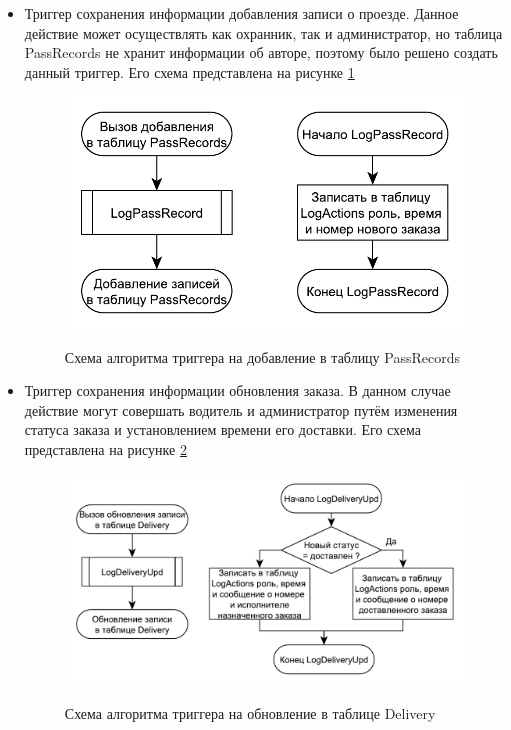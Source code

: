 \begin{itemize}
	\item Триггер сохранения информации добавления записи о проезде. Данное действие может осуществлять как охранник, так и администратор, но таблица PassRecords не хранит информации об авторе, поэтому было решено создать данный триггер. Его схема представлена на рисунке \ref{pass_trig}
	
	\begin{figure}[h!]
		\begin{center}
			{\includegraphics[scale=0.4, angle=0]{sql_schemes/pass_rec}}
			\caption{Схема алгоритма триггера на добавление в таблицу PassRecords}
			\label{pass_trig}
		\end{center}
	\end{figure}

	\item Триггер сохранения информации обновления заказа. В данном случае действие могут совершать водитель и администратор путём изменения статуса заказа и установлением времени его доставки. Его схема представлена на рисунке \ref{del_trig}
	
	\begin{figure}[h!]
		\begin{center}
			{\includegraphics[scale=0.4, angle=0]{sql_schemes/del}}
			\caption{Схема алгоритма триггера на обновление в таблице Delivery}
			\label{del_trig}
		\end{center}
	\end{figure}
\end{itemize}


